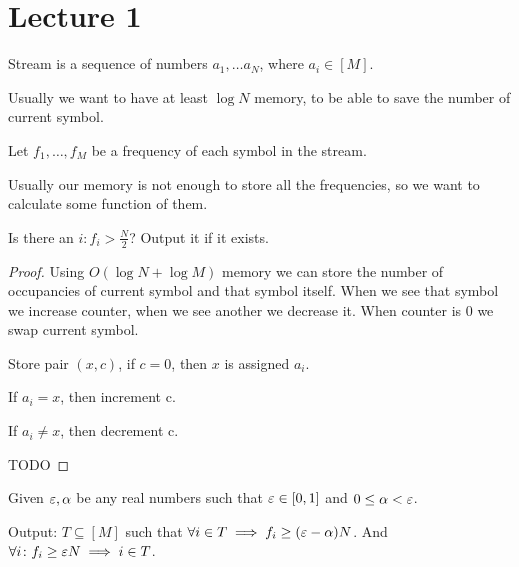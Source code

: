 
\section{Lecture 1}

\begin{df}[Stream]
	Stream is a sequence of numbers $a_1, \ldots a_N$, where  $a_i \in [M]$. 

	Usually we want to have at least $\log N$ memory, to be able to save the number of current symbol.
\end{df}

\begin{df}
	Let $f_1, \ldots, f_M$ be a frequency of each symbol in the stream.

	Usually our memory is not enough to store all the frequencies, so we want to calculate some function of them.
\end{df}

\begin{problem}
	Is there an $i \colon f_i > \frac{N}{2}$? Output it if it exists.
\end{problem}

\begin{proof}
	Using $O(\log N + \log M)$ memory we can store the number of occupancies of current symbol and that symbol itself. When we see that symbol we increase counter, when we see another we decrease it. When counter is 0 we swap current symbol.

	Store pair $(x, c)$, if $c = 0$, then $x$ is assigned $a_i$. 

	If $a_i = x$, then increment c.

	If  $a_i \neq x$, then decrement c.

	TODO
\end{proof}

\begin{problem}
	Given $\varepsilon, \alpha$ be any real numbers such that $\varepsilon \in [0, 1]$ and  $0 \leq \alpha < \varepsilon$.

	Output: $T \subseteq [M]$ such that  $\forall i \in T \implies f_i \geq (\varepsilon - \alpha) N$.
	And  $\forall i \colon f_i \geq \varepsilon N \implies i \in T$.
\end{problem}


